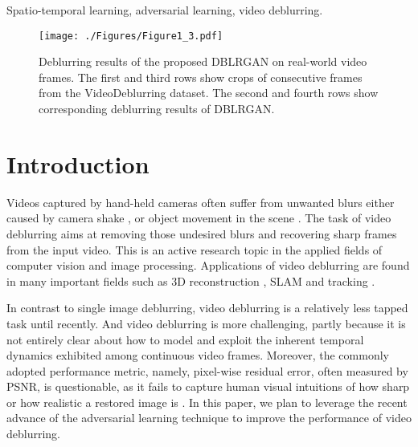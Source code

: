 \documentclass[journal]{IEEEtran}
\begin{document}
\begin{IEEEkeywords}
Spatio-temporal learning, adversarial learning, video deblurring.
\end{IEEEkeywords}






%
\IEEEpeerreviewmaketitle


\begin{figure*}[tb]
\centering
\texttt{[image: ./Figures/Figure1\_3.pdf]}
\caption{Deblurring results of the proposed DBLRGAN on real-world video frames. The first and third rows show crops of consecutive frames from the VideoDeblurring dataset. The second and fourth rows show corresponding deblurring results of DBLRGAN. }
\label{figure1}
\end{figure*}

\section{Introduction}

Videos captured by hand-held cameras often suffer from unwanted blurs either caused by camera shake \cite{kang2007automatic}, or object movement in the scene \cite{sun2015learning,shi2015just}. The task of video deblurring aims at removing those undesired blurs and recovering sharp frames from the input video. This is an active research topic in the applied fields of computer vision and image processing.  Applications of video deblurring are found in many important fields such as 3D reconstruction \cite{seok2013dense}, SLAM \cite{lee2011simultaneous} and tracking \cite{jin2005visual}. 

In contrast to single image deblurring, video deblurring is a relatively less tapped task until recently.  And video deblurring is more challenging, partly because  it is not entirely clear about how to model and exploit the inherent temporal dynamics exhibited among continuous video frames. Moreover, the commonly adopted performance metric, namely, pixel-wise residual error, often measured by PSNR, is questionable, as it fails to capture human visual intuitions of how sharp or how realistic a restored image is  \cite{wang2003multiscale,wang2004image}.  In this paper, we plan to leverage the recent advance of the adversarial learning technique to improve the performance of video deblurring.  
\end{document}
